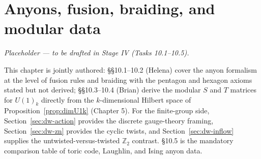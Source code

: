 \chapter{Anyons, fusion, braiding, and modular data}\label{ch:anyons}

\emph{Placeholder --- to be drafted in Stage IV (Tasks 10.1--10.5).}

This chapter is jointly authored: \S\S10.1--10.2 (Helena) cover the anyon formalism at the level of fusion rules and braiding with the pentagon and hexagon axioms stated but not derived; \S\S10.3--10.4 (Brian) derive the modular $S$ and $T$ matrices for $U(1)_k$ directly from the $k$-dimensional Hilbert space of Proposition~\ref{prop:dimU1k} (Chapter 5). For the finite-group side, Section~\ref{sec:dw-action} provides the discrete gauge-theory framing, Section~\ref{sec:dw-zn} provides the cyclic twists, and Section~\ref{sec:dw-inflow} supplies the untwisted-versus-twisted $\mathbb{Z}_2$ contrast. \S10.5 is the mandatory comparison table of toric code, Laughlin, and Ising anyon data.
